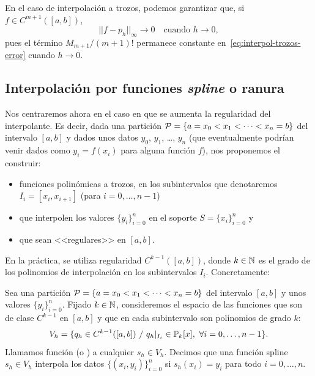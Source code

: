 \begin{remark}
  \label{rk:3}
  En el caso de interpolación a trozos, podemos garantizar que, si
  $f\in C^{m+1}([a,b])$,
  \begin{equation*}
    ||f-p_h||_\infty \to 0 \quad \text{cuando } h \to 0,
  \end{equation*}
  pues el término $M_{m+1}/(m+1)!$ permanece constante
  en~\ref{eq:interpol-trozos-error} cuando $h\to 0$.
\end{remark}

\subsection{Interpolación por funciones \textit{spline} o ranura}
\label{sec:splines}

Nos centraremos ahora en
el caso en que se aumenta la regularidad del interpolante.
Es decir, dada una partición
${\cal P}= \{a = x_0 <x_1 < \cdots <x_n=b\}$
del intervalo $[a,b]$ y dados unos datos $y_0$, $y_1$, \dots, $y_n$
(que eventualmente podrían venir dados como $y_i=f(x_i)$ para alguna
función $f$), nos proponemos el construir:
\begin{itemize}
\item  funciones polinómicas a trozos, en los subintervalos que
  denotaremos $I_i=[x_{i},x_{i+1}]$ (para $ i=0,\dots,n-1$)
\item que interpolen los valores $\{y_i\}_{i=0}^n$ en el soporte
  $S=\{x_i\}_{i=0}^n$ y
\item que sean <<regulares>> en $[a,b]$.
\end{itemize}
En la práctica, se utiliza regularidad $C^{k-1}([a,b])$, donde
$k\in\operatorname{{\mathbb N}}$ es el grado de los polinomios de
interpolación en los subintervalos $I_i$. Concretamente:

\begin{definition}
  \label{def:funcion-spline}
  Sea una partición ${\cal P}= \{a = x_0 <x_1 < \cdots <x_n=b\}$ del
  intervalo $[a,b]$ y unos valores $\{y_i\}_{i=0}^n$. Fijado
  $k\in\operatorname{{\mathbb N}}$, consideremos el espacio de las funciones que son
  de clase $C^{k-1}$ en $[a,b]$ y que en cada subintervalo son
  polinomios de grado $k$:
  \begin{equation*}
    V_h = \{q_h \in C^{k-1}([a,b])\ / \ q_h|_{I_i}\in  \Pol_k[x],\ \forall i=0,\dots,n-1\}.
  \end{equation*}
  Llamamos función  (o ) a
  cualquier $s_h\in V_h$. Decimos que una función spline $s_h\in V_h$
  interpola los datos $\{(x_i,y_i)\}_{i=0}^n$ si $s_h(x_i)=y_i$ para
  todo $i=0,\dots,n$.
\end{definition}

